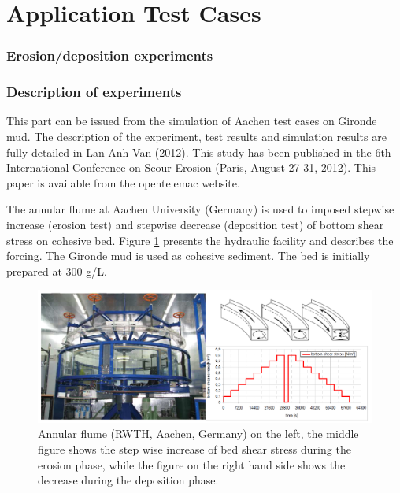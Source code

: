 
\section{Application Test Cases}

\subsubsection{Erosion/deposition experiments}

\subsubsection{Description of experiments}

This part can be issued from the simulation of Aachen test cases on Gironde
mud. The description of the experiment, test results and simulation results
are fully detailed in Lan Anh Van (2012). This study has been published in
the 6th International Conference on Scour Erosion (Paris, August 27-31,
2012). This paper is available from the opentelemac website.

The annular flume at Aachen University (Germany) is used to imposed stepwise
increase (erosion test) and stepwise decrease (deposition test) of bottom
shear stress on cohesive bed. Figure \ref{fig:4} presents the hydraulic facility and
describes the forcing. The Gironde mud is used as cohesive sediment. The bed
is initially prepared at $300$ g/L.

\begin{figure}[H]
\begin{center}
\includegraphics[scale=0.25,angle=0]{graphics/fig4.png}
\caption{Annular
flume (RWTH, Aachen, Germany) on the left, the middle figure shows the step
wise increase of bed shear stress during the erosion phase, while the figure
on the right hand side shows the decrease during the deposition phase.}\label{fig:4}
\end{center}
\end{figure}

